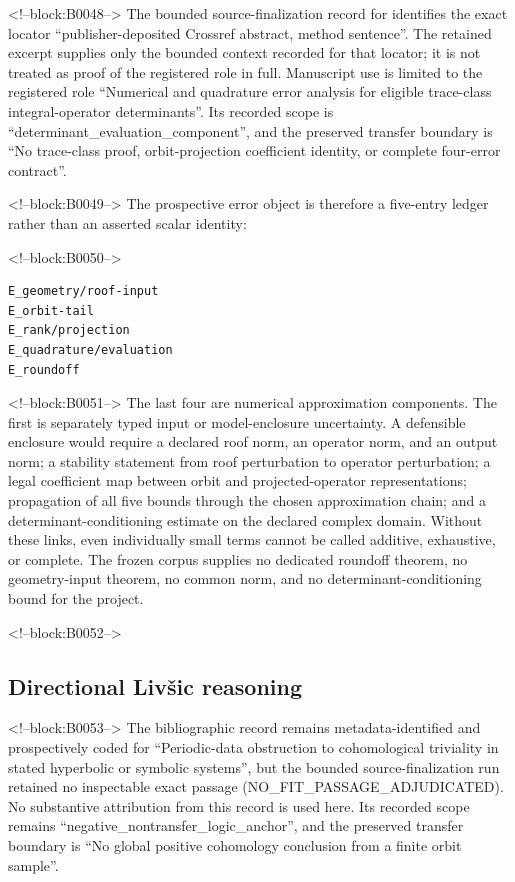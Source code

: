 \documentclass[11pt,a4paper]{article}
\begin{document}
<!--block:B0048-->
The bounded source-finalization record for \citep{P30-S22} identifies
the exact locator ``publisher-deposited Crossref abstract, method sentence''.  The retained excerpt supplies only the
bounded context recorded for that locator; it is not treated as proof of the
registered role in full.  Manuscript use is limited to the registered role ``Numerical and quadrature error analysis for eligible trace-class integral-operator determinants''.
Its recorded scope is ``determinant\_evaluation\_component'', and the preserved
transfer boundary is ``No trace-class proof, orbit-projection coefficient identity, or complete four-error contract''.

<!--block:B0049-->
The prospective error object is therefore a five-entry ledger rather than an asserted scalar identity:

<!--block:B0050-->
\begin{verbatim}
E_geometry/roof-input
E_orbit-tail
E_rank/projection
E_quadrature/evaluation
E_roundoff
\end{verbatim}

<!--block:B0051-->
The last four are numerical approximation components. The first is separately typed input or model-enclosure uncertainty. A defensible enclosure would require a declared roof norm, an operator norm, and an output norm; a stability statement from roof perturbation to operator perturbation; a legal coefficient map between orbit and projected-operator representations; propagation of all five bounds through the chosen approximation chain; and a determinant-conditioning estimate on the declared complex domain. Without these links, even individually small terms cannot be called additive, exhaustive, or complete. The frozen corpus supplies no dedicated roundoff theorem, no geometry-input theorem, no common norm, and no determinant-conditioning bound for the project.

<!--block:B0052-->
\subsection{Directional Livšic reasoning}

<!--block:B0053-->
The bibliographic record \citep{P30-S23} remains metadata-identified and
prospectively coded for ``Periodic-data obstruction to cohomological triviality in stated hyperbolic or symbolic systems'', but the bounded source-finalization
run retained no inspectable exact passage (NO\_FIT\_PASSAGE\_ADJUDICATED).  No substantive
attribution from this record is used here.  Its recorded scope remains
``negative\_nontransfer\_logic\_anchor'', and the preserved transfer boundary is ``No global positive cohomology conclusion from a finite orbit sample''.
\end{document}

